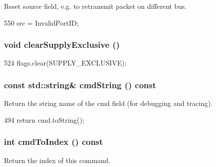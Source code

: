 Reset source field, e.g. to retransmit packet on different bus. 


\begin{DoxyCode}
550 { src = InvalidPortID; }
\end{DoxyCode}
\hypertarget{classPacket_a36834b936b153f19a035352b14cf180e}{
\subsubsection[{clearSupplyExclusive}]{\setlength{\rightskip}{0pt plus 5cm}void clearSupplyExclusive ()}}
\label{classPacket_a36834b936b153f19a035352b14cf180e}



\begin{DoxyCode}
524 { flags.clear(SUPPLY_EXCLUSIVE); }
\end{DoxyCode}
\hypertarget{classPacket_a863af57e28a01258236ea303155fc7ff}{
\subsubsection[{cmdString}]{\setlength{\rightskip}{0pt plus 5cm}const std::string\& cmdString () const}}
\label{classPacket_a863af57e28a01258236ea303155fc7ff}
Return the string name of the cmd field (for debugging and tracing). 


\begin{DoxyCode}
494 { return cmd.toString(); }
\end{DoxyCode}
\hypertarget{classPacket_a8db75870e65b9d86793f2805097c05a0}{
\subsubsection[{cmdToIndex}]{\setlength{\rightskip}{0pt plus 5cm}int cmdToIndex () const}}
\label{classPacket_a8db75870e65b9d86793f2805097c05a0}


Return the index of this command. 


